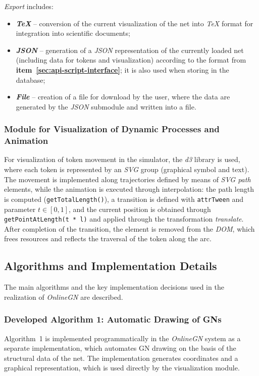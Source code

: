 	\textit{Export} includes:
	\vspace{-0.15cm}
	\begin{itemize}
		\item \textbf{\textit{TeX}} -- conversion of the current visualization of the net into \textit{TeX} format for integration into scientific documents;
		\item \textbf{\textit{JSON}} -- generation of a \textit{JSON} representation of the currently loaded net (including data for tokens and visualization) according to the format from \textbf{item~\ref{sec:api-script-interface}}; it is also used when storing in the database;
		\item \textbf{\textit{File}} -- creation of a file for download by the user, where the data are generated by the \textit{JSON} submodule and written into a file.
	\end{itemize}
	
	\subsubsection{Module for Visualization of Dynamic Processes and Animation}
	\hspace*{2.5em}For visualization of token movement in the simulator, the \textit{d3} library is used, where each token is represented by an \textit{SVG} group (graphical symbol and text). The movement is implemented along trajectories defined by means of \textit{SVG path} elements, while the animation is executed through interpolation: the path length is computed (\texttt{getTotalLength()}), a transition is defined with \texttt{attrTween} and parameter $t\in[0,1]$, and the current position is obtained through \texttt{getPointAtLength(t * l)} and applied through the transformation \textit{translate}. After completion of the transition, the element is removed from the \textit{DOM}, which frees resources and reflects the traversal of the token along the arc.
	
	\subsection{Algorithms and Implementation Details}
	\hspace*{2.5em}The main algorithms and the key implementation decisions used in the realization of \textit{OnlineGN} are described.
	
	\subsubsection{Developed Algorithm 1: Automatic Drawing of GNs}
	\hspace*{2.5em}Algorithm~1 is implemented programmatically in the \textit{OnlineGN} system as a separate implementation, which automates GN drawing on the basis of the structural data of the net. The implementation generates coordinates and a graphical representation, which is used directly by the visualization module.
	
